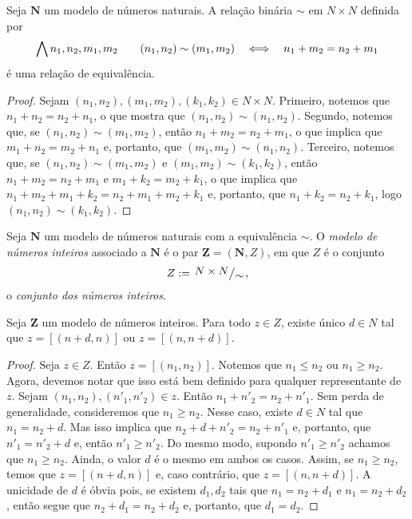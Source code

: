 \begin{proposition}
	Seja $\bm N$ um modelo de números naturais. A relação binária $\sim$ em $N \times N$ definida por
	\begin{equation*}
	\bigwedge\nolimits n_1,n_2,m_1,m_2 \qquad (n_1,n_2) \sim (m_1,m_2) \quad \Longleftrightarrow \quad n_1+m_2=n_2+m_1
	\end{equation*}
é uma relação de equivalência.
\end{proposition}
\begin{proof}
	Sejam $(n_1,n_2), (m_1,m_2),(k_1,k_2) \in N \times N$. Primeiro, notemos que $n_1+n_2=n_2+n_1$, o que mostra que $(n_1,n_2) \sim (n_1,n_2)$. Segundo, notemos que, se $(n_1,n_2) \sim (m_1,m_2)$, então $n_1+m_2=n_2+m_1$, o que implica que $m_1+n_2=m_2+n_1$ e, portanto, que $(m_1,m_2) \sim (n_1,n_2)$. Terceiro, notemos que, se $(n_1,n_2) \sim (m_1,m_2)$ e $(m_1,m_2) \sim (k_1,k_2)$, então $n_1+m_2=n_2+m_1$ e $m_1+k_2=m_2+k_1$, o que implica que $n_1+m_2+m_1+k_2=n_2+m_1+m_2+k_1$ e, portanto, que $n_1+k_2=n_2+k_1$, logo $(n_1,n_2) \sim (k_1,k_2)$.
\end{proof}

\begin{definition}
	Seja $\bm N$ um modelo de números naturais com a equivalência $\sim$. O \emph{modelo de números inteiros} associado a $\bm N$ é o par $\bm Z = (\bm N,Z)$, em que $Z$ é o conjunto 
	\begin{equation*}
	Z := \quo{N \times N}{\sim},
	\end{equation*}
o \emph{conjunto dos números inteiros}.
\end{definition}

\begin{proposition}
	Seja $\bm Z$ um modelo de números inteiros. Para todo $z \in Z$, existe único $d \in N$ tal que $z=[(n+d,n)]$ ou $z=[(n,n+d)]$.
\end{proposition}
\begin{proof}
	Seja $z \in Z$. Então $z=[(n_1,n_2)]$. Notemos que $n_1 \leq n_2$ ou $n_1 \geq n_2$. Agora, devemos notar que isso está bem definido para qualquer representante de $z$. Sejam $(n_1,n_2),(n'_1,n'_2) \in z$. Então $n_1+n'_2=n_2+n'_1$. Sem perda de generalidade, consideremos que $n_1 \geq n_2$. Nesse caso, existe $d \in N$ tal que $n_1=n_2+d$. Mas isso implica que $n_2+d+n'_2=n_2+n'_1$ e, portanto, que $n'_1=n'_2+d$ e, então $n'_1 \geq n'_2$. Do mesmo modo, supondo $n'_1 \geq n'_2$ achamos que $n_1 \geq n_2$. Ainda, o valor $d$ é o mesmo em ambos os casos. Assim, se $n_1 \geq n_2$, temos que $z=[(n+d,n)]$ e, caso contrário, que $z=[(n,n+d)]$. A unicidade de $d$ é óbvia pois, se existem $d_1,d_2$ tais que $n_1=n_2+d_1$ e $n_1=n_2+d_2$, então segue que $n_2+d_1=n_2+d_2$ e, portanto, que $d_1=d_2$.
\end{proof}

